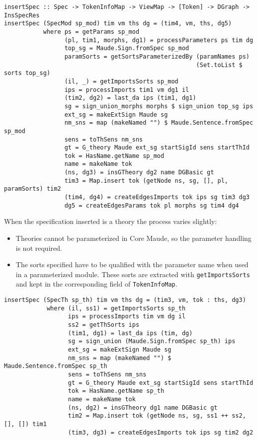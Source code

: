 {\codesize
\begin{verbatim}
insertSpec :: Spec -> TokenInfoMap -> ViewMap -> [Token] -> DGraph -> InsSpecRes
insertSpec (SpecMod sp_mod) tim vm ths dg = (tim4, vm, ths, dg5)
           where ps = getParams sp_mod
                 (pl, tim1, morphs, dg1) = processParameters ps tim dg
                 top_sg = Maude.Sign.fromSpec sp_mod
                 paramSorts = getSortsParameterizedBy (paramNames ps) 
                                                      (Set.toList $ sorts top_sg)
                 (il, _) = getImportsSorts sp_mod
                 ips = processImports tim1 vm dg1 il
                 (tim2, dg2) = last_da ips (tim1, dg1)
                 sg = sign_union_morphs morphs $ sign_union top_sg ips
                 ext_sg = makeExtSign Maude sg
                 nm_sns = map (makeNamed "") $ Maude.Sentence.fromSpec sp_mod
                 sens = toThSens nm_sns
                 gt = G_theory Maude ext_sg startSigId sens startThId
                 tok = HasName.getName sp_mod
                 name = makeName tok
                 (ns, dg3) = insGTheory dg2 name DGBasic gt
                 tim3 = Map.insert tok (getNode ns, sg, [], pl, paramSorts) tim2
                 (tim4, dg4) = createEdgesImports tok ips sg tim3 dg3
                 dg5 = createEdgesParams tok pl morphs sg tim4 dg4
\end{verbatim}
}

When the specification inserted is a theory the process varies slightly:

\begin{itemize}
\item Theories cannot be parameterized in Core Maude, so the parameter
handling is not required.
\item The sorts specified have to be qualified with the parameter
name when used in a parameterized module. These sorts are extracted
with \verb"getImportsSorts" and kept in the corresponding field of
\verb"TokenInfoMap".
\end{itemize}

{\codesize
\begin{verbatim}
insertSpec (SpecTh sp_th) tim vm ths dg = (tim3, vm, tok : ths, dg3)
            where (il, ss1) = getImportsSorts sp_th
                  ips = processImports tim vm dg il
                  ss2 = getThSorts ips
                  (tim1, dg1) = last_da ips (tim, dg)
                  sg = sign_union (Maude.Sign.fromSpec sp_th) ips
                  ext_sg = makeExtSign Maude sg
                  nm_sns = map (makeNamed "") $ Maude.Sentence.fromSpec sp_th
                  sens = toThSens nm_sns
                  gt = G_theory Maude ext_sg startSigId sens startThId
                  tok = HasName.getName sp_th
                  name = makeName tok
                  (ns, dg2) = insGTheory dg1 name DGBasic gt
                  tim2 = Map.insert tok (getNode ns, sg, ss1 ++ ss2, [], []) tim1
                  (tim3, dg3) = createEdgesImports tok ips sg tim2 dg2
\end{verbatim}
}

